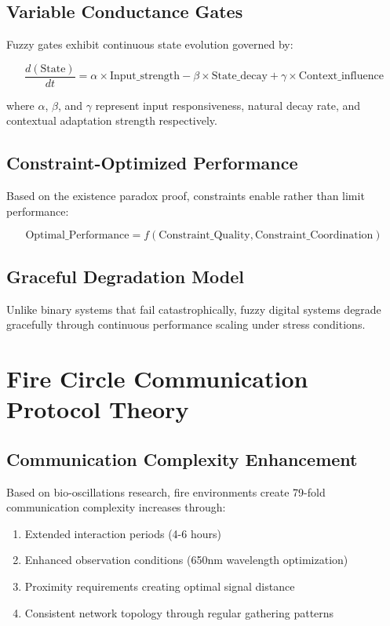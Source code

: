 \documentclass[12pt,a4paper]{article}
\begin{document}
\subsection{Variable Conductance Gates}

Fuzzy gates exhibit continuous state evolution governed by:

\begin{equation}
\frac{d(\text{State})}{dt} = \alpha \times \text{Input\_strength} - \beta \times \text{State\_decay} + \gamma \times \text{Context\_influence}
\end{equation}

where $\alpha$, $\beta$, and $\gamma$ represent input responsiveness, natural decay rate, and contextual adaptation strength respectively.

\subsection{Constraint-Optimized Performance}

Based on the existence paradox proof, constraints enable rather than limit performance:

\begin{equation}
\text{Optimal\_Performance} = f(\text{Constraint\_Quality}, \text{Constraint\_Coordination})
\end{equation}

\subsection{Graceful Degradation Model}

Unlike binary systems that fail catastrophically, fuzzy digital systems degrade gracefully through continuous performance scaling under stress conditions.

\section{Fire Circle Communication Protocol Theory}

\subsection{Communication Complexity Enhancement}

Based on bio-oscillations research, fire environments create 79-fold communication complexity increases through:

\begin{enumerate}
\item Extended interaction periods (4-6 hours)
\item Enhanced observation conditions (650nm wavelength optimization)
\item Proximity requirements creating optimal signal distance
\item Consistent network topology through regular gathering patterns
\end{enumerate}
\end{document}

